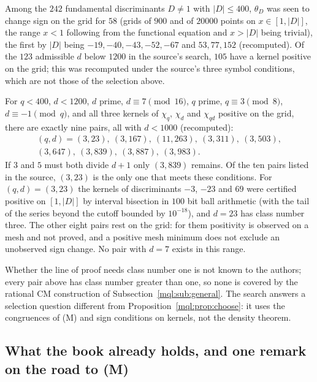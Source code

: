 \begin{remark}\label{mql:comp:theta}
Among the $242$ fundamental discriminants $D\ne1$ with $|D|\le400$, $\theta_D$ was seen to change sign on the grid for $58$ (grids of $900$ and of $20000$ points on $x\in[1,|D|]$, the range $x<1$ following from the functional equation and $x>|D|$ being trivial), the first by $|D|$ being $-19,-40,-43,-52,-67$ and $53,77,152$ (recomputed). Of the $123$ admissible $d$ below $1200$ in the source's search, $105$ have a kernel positive on the grid; this was recomputed under the source's three symbol conditions, which are not those of the selection above.
\end{remark}

\begin{remark}\label{mql:comp:pairs}
For $q<400$, $d<1200$, $d$ prime, $d\equiv7\pmod{16}$, $q$ prime, $q\equiv3\pmod8$, $d\equiv-1\pmod q$, and all three kernels of $\chi_{q}$, $\chi_{d}$ and $\chi_{qd}$ positive on the grid, there are exactly nine pairs, all with $d<1000$ (recomputed):
\begin{multline*}
(q,d)=(3,23),\ (3,167),\ (11,263),\ (3,311),\ (3,503),\\(3,647),\ (3,839),\ (3,887),\ (3,983).
\end{multline*}
If $3$ and $5$ must both divide $d+1$ only $(3,839)$ remains. Of the ten pairs listed in the source, $(3,23)$ is the only one that meets these conditions. For $(q,d)=(3,23)$ the kernels of discriminants $-3$, $-23$ and $69$ were certified positive on $[1,|D|]$ by interval bisection in $100$ bit ball arithmetic (with the tail of the series beyond the cutoff bounded by $10^{-18}$), and $d=23$ has class number three. The other eight pairs rest on the grid: for them positivity is observed on a mesh and not proved, and a positive mesh minimum does not exclude an unobserved sign change. No pair with $d=7$ exists in this range.
\end{remark}

Whether the line of proof needs class number one is not known to the authors; every pair above has class number greater than one, so none is covered by the rational CM construction of Subsection~\ref{mql:sub:general}. The search answers a selection question different from Proposition~\ref{mql:prop:choose}: it uses the congruences of (M) and sign conditions on kernels, not the density theorem.

\subsection{What the book already holds, and one remark on the road to (M)}\label{mql:sub:already}

